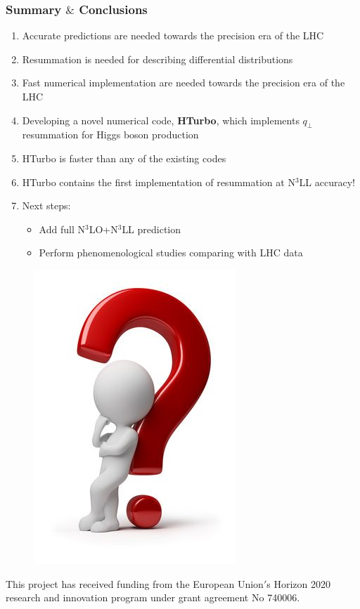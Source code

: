 \documentclass[aspectratio=43]{beamer}
\begin{document}
\begin{frame}
	
	\frametitle{Summary $\&$ Conclusions}
	
	\footnotesize
	
	\vspace{2.0 cm}
	
	\begin{enumerate}
		\item Accurate predictions are needed towards the precision era of the LHC
		\item Resummation is needed for describing differential distributions
		\item Fast numerical implementation are needed towards the precision era of the LHC
		\item Developing a novel numerical code, \textbf{HTurbo}, which implements $q_{\perp}$ resummation for Higgs boson production
		\item HTurbo is {\color{blue} faster than any of the existing codes}
		\item HTurbo contains the {\color{blue} first implementation of resummation at N$^{3}$LL accuracy!}
			
		\item Next steps: 
		\begin{itemize}
			\item Add full {\color{blue}N$^{3}$LO+N$^{3}$LL} prediction
			\item Perform phenomenological studies comparing with LHC data
		\end{itemize}
		
	\end{enumerate}

	\vspace{2.0 cm}

\end{frame}

\begin{frame}


	\begin{figure}
		\includegraphics[width = 2 cm]{plots/final/thinking.png}
	\end{figure}		

	{\small \color{blue} \footnotesize This project has received funding from the European Union$'$s Horizon 2020 research and innovation program under grant agreement No 740006.}

\end{frame}
\end{document}

